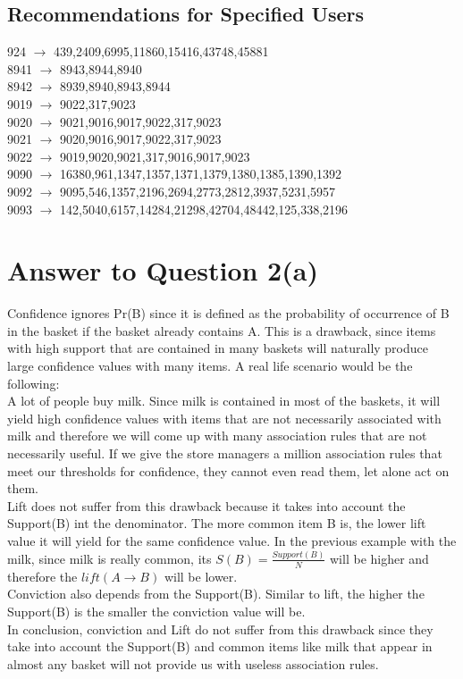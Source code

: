 \documentclass[11pt]{article}
\begin{document}
\subsection*{Recommendations for Specified Users}
924	$\rightarrow$	439,2409,6995,11860,15416,43748,45881 \\
8941 $\rightarrow$	8943,8944,8940 \\
8942 $\rightarrow$	8939,8940,8943,8944\\
9019 $\rightarrow$   9022,317,9023\\
9020 $\rightarrow$	9021,9016,9017,9022,317,9023\\
9021 $\rightarrow$	9020,9016,9017,9022,317,9023\\
9022 $\rightarrow$	9019,9020,9021,317,9016,9017,9023\\
9090 $\rightarrow$	16380,961,1347,1357,1371,1379,1380,1385,1390,1392\\
9092 $\rightarrow$	9095,546,1357,2196,2694,2773,2812,3937,5231,5957\\
9093 $\rightarrow$	142,5040,6157,14284,21298,42704,48442,125,338,2196\\

\pagebreak[4]
\section*{Answer to Question 2(a)}
Confidence ignores Pr(B) since it is defined as the probability of occurrence of B in the basket if the basket already contains A. This is a drawback, since items with high support that are contained in many baskets will naturally produce large confidence values with many items. A real life scenario would be the following:\\
A lot of people buy milk. Since milk is contained in most of the baskets, it will yield high confidence values with items that are not necessarily associated with milk and therefore we will come up with many association rules that are not necessarily useful. If we give the store managers a million association rules that meet our thresholds for confidence, they cannot even read them, let alone act on them. \\
Lift does not suffer from this drawback because it takes into account the Support(B) int the denominator. The more common item B is, the lower lift value it will yield for the same confidence value. In the previous example with the milk, since milk is really common, its $S(B) = \frac{Support(B)}{N}$ will be higher and therefore the $lift(A\rightarrow B)$ will be lower.\\
Conviction also depends from the Support(B). Similar to lift, the higher the Support(B) is the smaller the conviction value will be.\\
In conclusion, conviction and Lift do not suffer from this drawback since they take into account the Support(B) and common items like milk that appear in almost any basket will not provide us with useless association rules.
\pagebreak[4]
\end{document}
